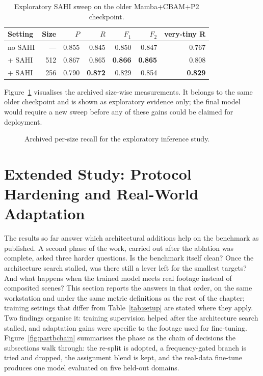 \documentclass[12pt,a4paper,oneside]{report}
\begin{document}
\begin{table}[tbp]
  \centering
  \caption{Exploratory SAHI sweep on the older Mamba+CBAM+P2 checkpoint.}
  \label{tab:sahi}
  \setlength{\tabcolsep}{5pt}
  \begin{tabular}{|l|r|r|r|r|r|r|}
    \hline
    Setting & Size & $P$ & $R$ & $F_1$ & $F_2$ & very-tiny R \\
    \hline
    no SAHI & --- & 0.855 & 0.845 & 0.850 & 0.847 & 0.767 \\ \hline
    + SAHI  & 512 & 0.867 & 0.865 & \textbf{0.866} & \textbf{0.865} & 0.808 \\ \hline
    + SAHI  & 256 & 0.790 & \textbf{0.872} & 0.829 & 0.854 & \textbf{0.829} \\
    \hline
  \end{tabular}
\end{table}

Figure~\ref{fig:sahibars} visualises the archived size-wise measurements. It
belongs to the same older checkpoint and is shown as exploratory evidence only;
the final model would require a new sweep before any of these gains could be
claimed for deployment.

\begin{figure}[tbp]
  \centering
  \caption{Archived per-size recall for the exploratory inference study.}
  \label{fig:sahibars}
\end{figure}

\section{Extended Study: Protocol Hardening and Real-World Adaptation}
\label{sec:partb}
The results so far answer which architectural additions help on the benchmark
as published. A second phase of the work, carried out after the ablation was
complete, asked three harder questions. Is the benchmark itself clean? Once the
architecture search stalled, was there still a lever left for the smallest
targets? And what happens when the trained model meets real footage instead of
composited scenes? This section reports the answers in that order, on the same
workstation and under the same metric definitions as the rest of the chapter;
training settings that differ from Table~\ref{tab:setup} are stated where they
apply. Two findings organise it: training supervision helped after the
architecture search stalled, and adaptation gains were specific to the footage
used for fine-tuning. Figure~\ref{fig:partbchain} summarises the phase as the chain
of decisions the subsections walk through: the re-split is adopted, a
frequency-gated branch is tried and dropped, the assignment blend is kept,
and the real-data fine-tune produces one model evaluated on five held-out
domains.
\end{document}
